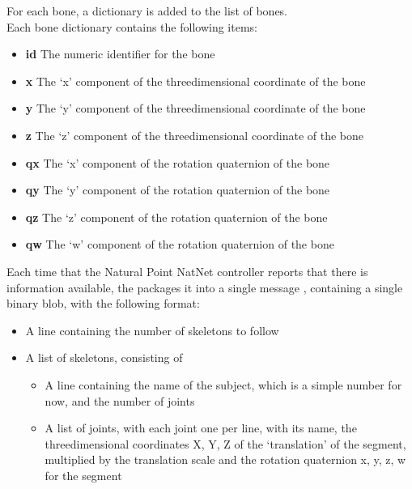 For each bone, a dictionary is added to the list of bones.\\

Each bone dictionary contains the following items:
\begin{itemize}
\item \textbf{id} \longDash{} The numeric identifier for the bone
\item\exSp\textbf{x} \longDash{} The `x' component of the three\longDash{}dimensional
coordinate of the bone
\item\exSp\textbf{y} \longDash{} The `y' component of the three\longDash{}dimensional
coordinate of the bone
\item\exSp\textbf{z} \longDash{} The `z' component of the three\longDash{}dimensional
coordinate of the bone
\item\exSp\textbf{qx} \longDash{} The `x' component of the rotation quaternion of the bone
\item\exSp\textbf{qy} \longDash{} The `y' component of the rotation quaternion of the bone
\item\exSp\textbf{qz} \longDash{} The `z' component of the rotation quaternion of the bone
\item\exSp\textbf{qw} \longDash{} The `w' component of the rotation quaternion of the bone
\end{itemize}
\primaryEnd
{}
Each time that the Natural Point NatNet controller reports that there is information
available, the  packages it into a single message
\openSq{}\closeSq, containing a single binary blob, with the following
format:
\begin{itemize}
\item A line containing the number of skeletons to follow
\item\exSp{}A list of skeletons, consisting of
\begin{itemize}
\item A line containing the name of the subject, which is a simple number for now, and the
number of joints
\item\exSp{}A list of joints, with each joint one per line, with its name, the
three\longDash{}dimensional coordinates \openSq{}X, Y, Z\closeSq{} of the `translation'
of the segment, multiplied by the translation scale and the rotation quaternion
\openSq{}x, y, z, w\closeSq{} for the segment
\end{itemize}
\end{itemize}
\primaryEnd{}
